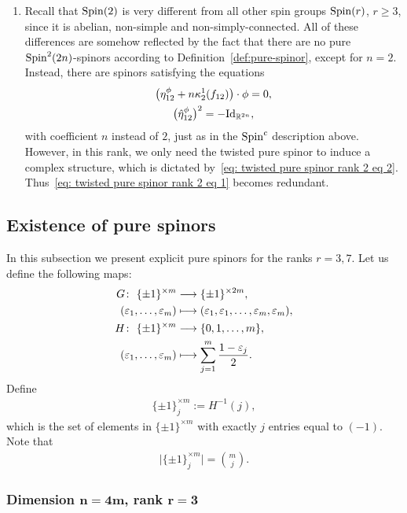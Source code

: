 \documentclass[pdftex]{sigma}
\newcommand{\lra}{\longrightarrow}
\numberwithin{equation}{section}
\begin{document}
\begin{enumerate}
\item Recall that ${\rm Spin}(2)$ is very different from all other spin groups ${\rm Spin}(r)$, $r\geq 3$, since it is abelian, non-simple and non-simply-connected. All of these differences are somehow reflected by the fact that there are no pure ${\rm Spin}^2(2n)$-spinors according to Definition~\ref{def:pure-spinor}, except for $n=2$. Instead, there are spinors satisfying the equations
\begin{gather}
 \big(\eta_{12}^\phi + n \kappa_2^1(f_{12})\big) \cdot\phi = 0,\label{eq: twisted pure spinor rank 2 eq 1}\\
 \big(\hat\eta_{12}^\phi\big)^2 = -{\rm Id}_{\mathbb{R}^{2n}},\label{eq: twisted pure spinor rank 2 eq 2}
\end{gather}
with coefficient $n$ instead of $2$, just as in the ${\rm Spin}^c$ description above. However, in this rank, we only need the twisted pure spinor to induce a complex structure, which is dictated by~\eqref{eq: twisted pure spinor rank 2 eq 2}. Thus~\eqref{eq: twisted pure spinor rank 2 eq 1} becomes redundant.
\end{enumerate}

\subsection{Existence of pure spinors}\label{subsec: existence pure spinors}

In this subsection we present explicit pure spinors for the ranks $r= 3,7$.
Let us define the following maps:
\begin{align*}
 G\colon \ \{\pm 1\}^{\times m} &\lra \{\pm 1\}^{\times 2m},\\
 (\varepsilon_1,\dots,\varepsilon_m) &\longmapsto (\varepsilon_1,\varepsilon_1,\dots,\varepsilon_m,\varepsilon_m),\\
 H\colon \ \{\pm 1\}^{\times m} &\lra \{0,1,\dots,m\},\\
 (\varepsilon_1,\dots,\varepsilon_m) &\longmapsto \sum_{j=1}^m {1-\varepsilon_j\over 2}.
\end{align*}
Define
\begin{gather*}\{\pm1\}_j^{\times m} := H^{-1}(j),\end{gather*}
which is the set of elements in $\{\pm1\}^{\times m}$ with exactly $j$ entries equal to $(-1)$. Note that
\begin{gather*}\big|\{\pm1\}_j^{\times m}\big|={m\choose j}.\end{gather*}

\subsubsection[Dimension $n=4m$, rank $r=3$]{Dimension $\boldsymbol{n=4m}$, rank $\boldsymbol{r=3}$}\label{subsec:QK-pure-spinor}
\end{document}
